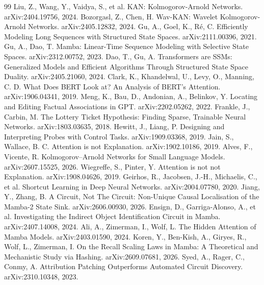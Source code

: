\documentclass[11pt]{article}
\begin{document}
\begin{thebibliography}{99}
 Liu, Z., Wang, Y., Vaidya, S., et al. KAN: Kolmogorov-Arnold
Networks. arXiv:2404.19756, 2024.
 Bozorgasl, Z., Chen, H. Wav-KAN: Wavelet
Kolmogorov-Arnold Networks. arXiv:2405.12832, 2024.
 Gu, A., Goel, K., R\'e, C. Efficiently Modeling Long
Sequences with Structured State Spaces. arXiv:2111.00396, 2021.
 Gu, A., Dao, T. Mamba: Linear-Time Sequence Modeling with
Selective State Spaces. arXiv:2312.00752, 2023.
 Dao, T., Gu, A. Transformers are SSMs: Generalized Models
and Efficient Algorithms Through Structured State Space Duality.
arXiv:2405.21060, 2024.
 Clark, K., Khandelwal, U., Levy, O., Manning, C. D.
What Does BERT Look at? An Analysis of BERT's Attention.
arXiv:1906.04341, 2019.
 Meng, K., Bau, D., Andonian, A., Belinkov, Y. Locating and
Editing Factual Associations in GPT. arXiv:2202.05262, 2022.
 Frankle, J., Carbin, M. The Lottery Ticket Hypothesis:
Finding Sparse, Trainable Neural Networks. arXiv:1803.03635, 2018.
 Hewitt, J., Liang, P. Designing and Interpreting
Probes with Control Tasks. arXiv:1909.03368, 2019.
 Jain, S., Wallace, B. C. Attention is not
Explanation. arXiv:1902.10186, 2019.
 Alves, F., Vicente, R. Kolmogorov--Arnold Networks
for Small Language Models. arXiv:2607.15525, 2026.
 Wiegreffe, S., Pinter, Y. Attention is not not
Explanation. arXiv:1908.04626, 2019.
 Geirhos, R., Jacobsen, J.-H., Michaelis, C., et al.
Shortcut Learning in Deep Neural Networks. arXiv:2004.07780, 2020.
 Jiang, Y., Zhang, B. A Circuit, Not The Circuit:
Non-Unique Causal Localisation of the Mamba-2 State Sink.
arXiv:2606.00930, 2026.
 Ensign, D., Garriga-Alonso, A., et al. Investigating
the Indirect Object Identification Circuit in Mamba. arXiv:2407.14008,
2024.
 Ali, A., Zimerman, I., Wolf, L. The Hidden
Attention of Mamba Models. arXiv:2403.01590, 2024.
 Koren, Y., Ben-Kish, A., Giryes, R., Wolf, L.,
Zimerman, I. On the Recall Scaling Laws in Mamba: A Theoretical and
Mechanistic Study via Hashing. arXiv:2609.07681, 2026.
 Syed, A., Rager, C., Conmy, A. Attribution Patching
Outperforms Automated Circuit Discovery. arXiv:2310.10348, 2023.
\end{thebibliography}

\appendix
\end{document}
